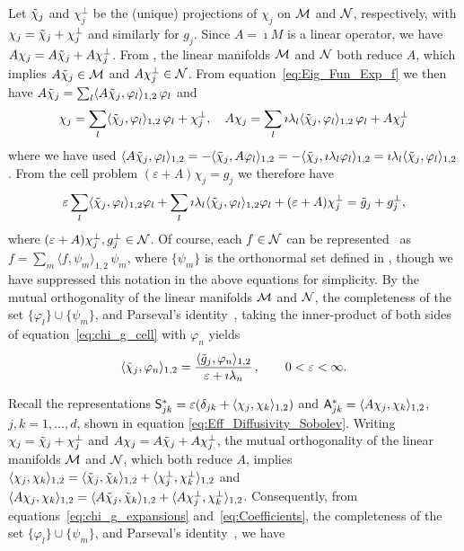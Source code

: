 \documentclass[amsa]{ipart}
\begin{document}
Let $\tilde{\chi}_j$ and $\chi_j^\perp$ be the (unique) projections of $\chi_j$
on $\mathcal{M}$ and $\mathcal{N}$, respectively, with $\chi_j=\tilde{\chi}_j+\chi_j^\perp$ and
similarly for $g_j$. Since $A=\imath M$ is a linear operator, we have 
$A\chi_j=A\tilde{\chi}_j+A\chi_j^\perp$. From , the
linear manifolds $\mathcal{M}$ and $\mathcal{N}$ both reduce $A$, which implies 
$A\tilde{\chi}_j\in\mathcal{M}$ and $A\chi_j^\perp\in\mathcal{N}$. From
equation~\eqref{eq:Eig_Fun_Exp_f} we then have
$A\tilde{\chi}_j=\sum_l\langle A\tilde{\chi}_j,\varphi_l\rangle_{1,2}\,\varphi_l$ and       
%
\begin{align}\label{eq:chi_g_expansions}
  \chi_j=\sum_l\langle\chit_j,\varphi_l\rangle_{1,2}\,\varphi_l +\chi_j^\perp,
  \quad
  A\chi_j=\sum_l\imath\lambda_l\langle\chit_j,\varphi_l\rangle_{1,2}\,\varphi_l +A\chi_j^\perp
\end{align}
%
where we have used 
$\langle A\tilde{\chi}_j,\varphi_l\rangle_{1,2}=-\langle\tilde{\chi}_j,A\varphi_l\rangle_{1,2}=-\langle\tilde{\chi}_j,\imath \lambda_l\varphi_l\rangle_{1,2}=\imath\lambda_l\langle\tilde{\chi}_j,\varphi_l\rangle_{1,2}$. From the
cell problem $(\varepsilon+A)\chi_j=g_j$ we therefore have
%
\begin{align}\label{eq:chi_g_cell}
  \varepsilon\sum_l\langle\chit_j,\varphi_l\rangle_{1,2}\varphi_l + \sum_l\imath\lambda_l\langle\chit_j,\varphi_l\rangle_{1,2}\varphi_l + (\varepsilon+A)\chi_j^\perp=\gt_j+g_j^\perp,
\end{align}
%
where $(\varepsilon+A)\chi_j^\perp,g_j^\perp\in\mathcal{N}$. Of course, each $f\in\mathcal{N}$ can be
represented~\cite{Stone:64} as $f=\sum_m\langle f,\psi_m\rangle_{1,2}\,\psi_m$, where $\{\psi_m\}$ is the
orthonormal set defined in , though we
have suppressed this notation in the above equations for
simplicity. By the mutual orthogonality of the linear manifolds
$\mathcal{M}$ and $\mathcal{N}$, the completeness of the set $\{\varphi_l\}\cup\{\psi_m\}$, and 
Parseval's identity~\cite{PapaRudin:87}, taking the inner-product of
both sides of equation~\eqref{eq:chi_g_cell} with $\varphi_n$ yields
%
\begin{align}\label{eq:Coefficients}
  \langle\chit_j,\varphi_n\rangle_{1,2}=\frac{\langle\gt_j,\varphi_n\rangle_{1,2}}{\varepsilon+\imath\lambda_n}\,,
  \qquad
  0<\varepsilon<\infty.
\end{align}
%




Recall the representations $\mathsf{S}^*_{jk}=\varepsilon(\delta_{jk}+\langle\chi_j,\chi_k\rangle_{1,2})$ and
$\mathsf{A}^*_{jk}=\langle A\chi_j,\chi_k\rangle_{1,2}$, $j,k=1,\ldots,d$, shown in equation 
\eqref{eq:Eff_Diffusivity_Sobolev}. Writing $\chi_j=\tilde{\chi}_j+\chi_j^\perp$ and
$A\chi_j=A\tilde{\chi}_j+A\chi_j^\perp$, the mutual orthogonality of the linear
manifolds $\mathcal{M}$ and $\mathcal{N}$, which both reduce $A$, implies 
$\langle\chi_j,\chi_k\rangle_{1,2}=\langle\tilde{\chi}_j,\tilde{\chi}_k\rangle_{1,2}+\langle\chi^\perp_j,\chi^\perp_k\rangle_{1,2}$ and
$\langle A\chi_j,\chi_k\rangle_{1,2}=\langle A\tilde{\chi}_j,\tilde{\chi}_k\rangle_{1,2}+\langle A\chi^\perp_j,\chi^\perp_k\rangle_{1,2}$. Consequently,
from equations~\eqref{eq:chi_g_expansions}
and~\eqref{eq:Coefficients}, the completeness of the set
$\{\varphi_l\}\cup\{\psi_m\}$, and Parseval's identity~\cite{PapaRudin:87}, we have  
\end{document}

